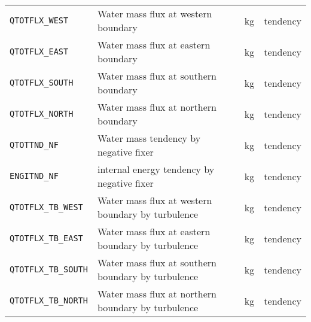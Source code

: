 \begin{table}[h]
\begin{center}
\begin{tabularx}{150mm}{|l|X|l|l|}
      \verb|QTOTFLX_WEST|  & Water mass flux at western  boundary     & kg & tendency \\
      \verb|QTOTFLX_EAST|  & Water mass flux at eastern  boundary     & kg & tendency \\
      \verb|QTOTFLX_SOUTH| & Water mass flux at southern boundary     & kg & tendency \\
      \verb|QTOTFLX_NORTH| & Water mass flux at northern boundary     & kg & tendency \\
      \verb|QTOTTND_NF|    & Water mass tendency by negative fixer                & kg & tendency \\
      \verb|ENGITND_NF|    & internal energy tendency by negative fixer           & kg & tendency \\
      \verb|QTOTFLX_TB_WEST|  & Water mass flux at western  boundary by turbulence & kg & tendency \\
      \verb|QTOTFLX_TB_EAST|  & Water mass flux at eastern  boundary by turbulence & kg & tendency \\
      \verb|QTOTFLX_TB_SOUTH| & Water mass flux at southern boundary by turbulence & kg & tendency \\
      \verb|QTOTFLX_TB_NORTH| & Water mass flux at northern boundary by turbulence & kg & tendency \\
    \hline
  \end{tabularx}
\end{center}
\end{table}

